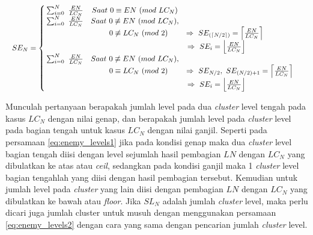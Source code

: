 \begin{equation}\label{eq:enemy_levels2}
\resizebox{\columnwidth}{!}{%
	$SE_{N} = \left\{\begin{matrix}
	\hspace{0.2em} \sum_{i = 0}^{N}\ \frac{EN}{LC_{N}} & Saat\ 0 \equiv EN\ (mod\ LC_{N}) & \\
	
	\hspace{0.2em} \sum_{i = 0}^{N}\ \frac{EN}{LC_{N}} & Saat\ 0 \not\equiv EN\ (mod\ LC_{N}), & \\
	&\hspace{1.0em}  0 \not\equiv LC_{N}\ (mod\ 2) & \hspace{-4.0em} \Rightarrow\ SE_{(\left \lceil N/2 \right \rceil)}  = \left \lceil \frac{EN}{LC_{N}} \right \rceil &\\
	
	& & \hspace{-6.2em} \Rightarrow\ SE_{i}  = \left \lfloor \frac{EN}{LC_{N}} \right \rfloor &\\
	
	\hspace{0.2em} \sum_{i = 0}^{N}\ \frac{EN}{LC_{N}} & Saat\ 0 \not\equiv EN\ (mod\ LC_{N}), & \\
	&\hspace{1.0em}  0 \equiv LC_{N}\ (mod\ 2) & \Rightarrow\ SE_{N/2},\ SE_{(N/2) + 1}  = \left \lceil \frac{EN}{LC_{N}} \right \rceil &\\
	
	& & \hspace{-6.2em} \Rightarrow\ SE_{i}  = \left \lfloor \frac{EN}{LC_{N}} \right \rfloor &\\
	\end{matrix}\right.$%
}
\end{equation}
\vspace{1ex}

Munculah pertanyaan berapakah jumlah level pada dua \textit{cluster} level tengah pada kasus $LC_{N}$ dengan nilai genap, dan berapakah jumlah level pada \textit{cluster} level pada bagian tengah untuk kasus $LC_{N}$ dengan nilai ganjil. Seperti pada persamaan \ref{eq:enemy_levels1} jika pada kondisi genap maka dua \textit{cluster} level bagian tengah diisi dengan level sejumlah hasil pembagian $LN$ dengan $LC_{N}$ yang dibulatkan ke atas atau \textit{ceil}, sedangkan pada kondisi ganjil maka 1 \textit{cluster} level bagian tengahlah yang diisi dengan hasil pembagian tersebut. Kemudian untuk jumlah level pada \textit{cluster} yang lain diisi dengan pembagian $LN$ dengan $LC_{N}$ yang dibulatkan ke bawah atau \textit{floor}. Jika $SL_{N}$ adalah jumlah \textit{cluster} level, maka perlu dicari juga jumlah cluster untuk musuh dengan menggunakan persamaan \ref{eq:enemy_levels2} dengan cara yang sama dengan pencarian jumlah \textit{cluster} level. 
\vspace{1ex}

